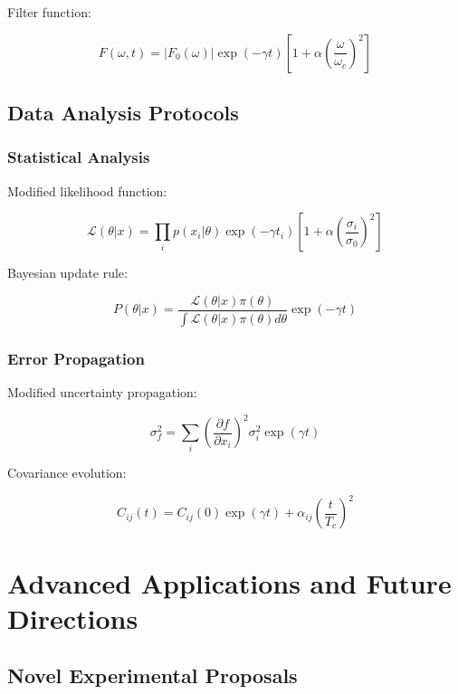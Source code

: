 \documentclass[12pt]{article}
\theoremstyle{plain}
\theoremstyle{definition}
\theoremstyle{remark}
\begin{document}
Filter function:

\begin{equation}
F(\omega,t) = |F_0(\omega)|\exp(-\gamma t)\left[1 + \alpha\left(\frac{\omega}{\omega_c}\right)^2\right]
\end{equation}

\subsection{Data Analysis Protocols}

\subsubsection{Statistical Analysis}

Modified likelihood function:

\begin{equation}
\mathcal{L}(\theta|x) = \prod_i p(x_i|\theta)\exp(-\gamma t_i)\left[1 + \alpha\left(\frac{\sigma_i}{\sigma_0}\right)^2\right]
\end{equation}

Bayesian update rule:

\begin{equation}
P(\theta|x) = \frac{\mathcal{L}(\theta|x)\pi(\theta)}{\int \mathcal{L}(\theta|x)\pi(\theta)d\theta}\exp(-\gamma t)
\end{equation}

\subsubsection{Error Propagation}

Modified uncertainty propagation:

\begin{equation}
\sigma_f^2 = \sum_i \left(\frac{\partial f}{\partial x_i}\right)^2\sigma_i^2\exp(\gamma t)
\end{equation}

Covariance evolution:

\begin{equation}
C_{ij}(t) = C_{ij}(0)\exp(\gamma t) + \alpha_{ij}\left(\frac{t}{T_c}\right)^2
\end{equation}
\section{Advanced Applications and Future Directions}

\subsection{Novel Experimental Proposals}
\end{document}
